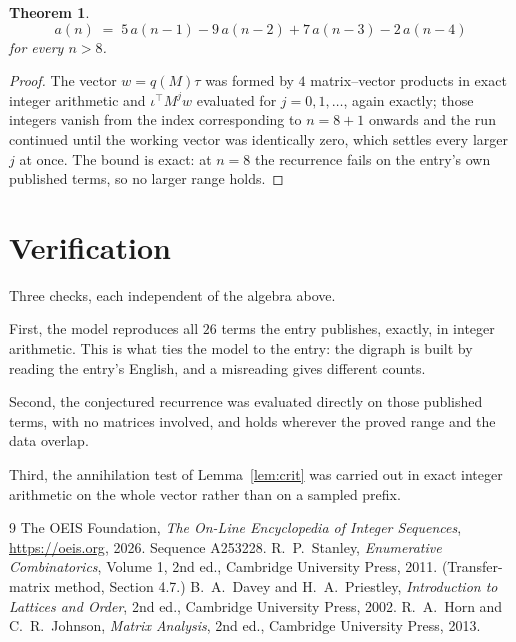 \documentclass[11pt,a4paper]{article}
\theoremstyle{plain}
\newtheorem{theorem}{Theorem}
\theoremstyle{definition}
\begin{document}
\begin{theorem}
\[
a(n)\;=\;5\,a(n-1) - 9\,a(n-2) + 7\,a(n-3) - 2\,a(n-4)
\]
for every $n>8$.
\end{theorem}

\begin{proof}
The vector $w=q(M)\tau$ was formed by $4$ matrix--vector products in exact integer
arithmetic and $\iota^{\!\top}M^{j}w$ evaluated for $j=0,1,\dots$, again exactly; those
integers vanish from the index corresponding to $n=8+1$ onwards and the run continued
until the working vector was identically zero, which settles every larger $j$ at once. The bound is exact: at $n=8$ the recurrence fails on the entry's own published terms, so no larger range holds.
\end{proof}

\section{Verification}

Three checks, each independent of the algebra above.

First, the model reproduces all $26$ terms the entry publishes, exactly, in integer
arithmetic. This is what ties the model to the entry: the digraph is built by reading the
entry's English, and a misreading gives different counts.

Second, the conjectured recurrence was evaluated directly on those published terms, with no
matrices involved, and holds wherever the proved range and the data overlap.

Third, the annihilation test of Lemma~\ref{lem:crit} was carried out in exact integer
arithmetic on the whole vector rather than on a sampled prefix.

\begin{thebibliography}{9}
 The OEIS Foundation, \emph{The On-Line Encyclopedia of Integer
Sequences}, \url{https://oeis.org}, 2026. Sequence A253228.
 R.~P.~Stanley, \emph{Enumerative Combinatorics}, Volume 1, 2nd ed.,
Cambridge University Press, 2011. (Transfer-matrix method, Section 4.7.)
 B.~A.~Davey and H.~A.~Priestley, \emph{Introduction to Lattices and
Order}, 2nd ed., Cambridge University Press, 2002.
 R.~A.~Horn and C.~R.~Johnson, \emph{Matrix Analysis}, 2nd ed., Cambridge
University Press, 2013.
\end{thebibliography}
\end{document}
